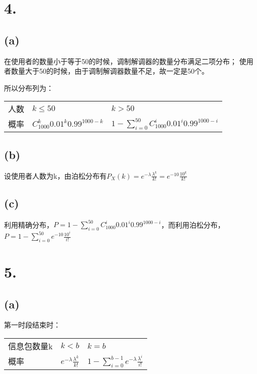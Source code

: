\documentclass[UTF8]{report}
\begin{document}
    \section*{4.}
        \subsection*{(a)}
            在使用者的数量小于等于50的时候，调制解调器的数量分布满足二项分布；
            使用者数量大于50的时候，由于调制解调器数量不足，故一定是50个。

            所以分布列为：
            \begin{table}[!htbp]
                \begin{tabular}{lll}
                    人数 & $k \leq 50$ & $k > 50$ \\
                    概率 & $C_{1000}^k0.01^k0.99^{1000 - k}$ & $1 - \sum_{i = 0}^{50}C_{1000}^i0.01^i0.99^{1000 - i}$ 
                \end{tabular}
            \end{table}
        \subsection*{(b)}
            设使用者人数为k，由泊松分布有$P_X(k) = e^{-\lambda}\frac{\lambda^k}{k!} = e^{-10}\frac{10^k}{k!}$
        \subsection*{(c)}
            利用精确分布，$P = 1 - \sum_{i = 0}^{50}C_{1000}^i0.01^i0.99^{1000 - i}$，而利用泊松分布，$P = 1 - \sum_{i = 0}^{50}e^{-10}\frac{10^i}{i!}$
    \section*{5.}
        \subsection*{(a)}
            第一时段结束时：
            \begin{table}[!htbp]
                \begin{tabular}{lll}
                    信息包数量k & $k < b$ & $k = b$ \\
                    概率 & $e^{-\lambda}\frac{\lambda^k}{k!}$ & $1 - \sum_{i = 0}^{b - 1}e^{-\lambda}\frac{\lambda^i}{i!}$
                \end{tabular}
            \end{table}
\end{document}
